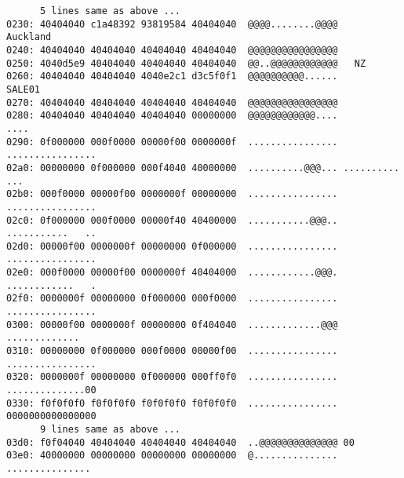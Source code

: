 \begin{verbatim}
      5 lines same as above ...
0230: 40404040 c1a48392 93819584 40404040  @@@@........@@@@     Auckland    
0240: 40404040 40404040 40404040 40404040  @@@@@@@@@@@@@@@@                 
0250: 4040d5e9 40404040 40404040 40404040  @@..@@@@@@@@@@@@   NZ            
0260: 40404040 40404040 4040e2c1 d3c5f0f1  @@@@@@@@@@......           SALE01
0270: 40404040 40404040 40404040 40404040  @@@@@@@@@@@@@@@@                 
0280: 40404040 40404040 40404040 00000000  @@@@@@@@@@@@....             ....
0290: 0f000000 000f0000 00000f00 0000000f  ................ ................
02a0: 00000000 0f000000 000f4040 40000000  ..........@@@... ..........   ...
02b0: 000f0000 00000f00 0000000f 00000000  ................ ................
02c0: 0f000000 000f0000 00000f40 40400000  ...........@@@.. ...........   ..
02d0: 00000f00 0000000f 00000000 0f000000  ................ ................
02e0: 000f0000 00000f00 0000000f 40404000  ............@@@. ............   .
02f0: 0000000f 00000000 0f000000 000f0000  ................ ................
0300: 00000f00 0000000f 00000000 0f404040  .............@@@ .............   
0310: 00000000 0f000000 000f0000 00000f00  ................ ................
0320: 0000000f 00000000 0f000000 000ff0f0  ................ ..............00
0330: f0f0f0f0 f0f0f0f0 f0f0f0f0 f0f0f0f0  ................ 0000000000000000
      9 lines same as above ...
03d0: f0f04040 40404040 40404040 40404040  ..@@@@@@@@@@@@@@ 00              
03e0: 40000000 00000000 00000000 00000000  @...............  ...............
\end{verbatim}

